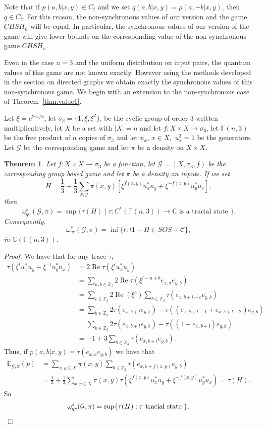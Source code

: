 \documentclass[11pt]{amsart}
\newtheorem{thm}{Theorem}[section]
\theoremstyle{definition}
\DeclareMathOperator{\re}{Re}
\newcommand{\bb}[1]{\mathbb{#1}}
\newcommand{\cl}[1]{\mathcal{#1}}
\begin{document}
Note that if $p(a, b| x, y) \in C_t$ and we set $q(a, b |x, y) = p(a, -b | x,y)$, then $q \in C_t$. For this reason, the non-synchronous values of our version and the game $CHSH_n$ will be equal. In particular, the synchronous values of our version of the game will give lower bounds on the corresponding value of the non-synchronous game $CHSH_n$. 
 
Even in the case $n=3$ and the uniform distribution on input pairs, the quantum values of this game are not known exactly.  However using the methods developed in the section on directed graphs we obtain exactly the synchronous values of this non-synchronous game.
We begin with an extension to the non-synchronous case of  Theorem~\ref{thm:value1}.

Let $\xi = e^{2 \pi i/3}$, let $\sigma_3 = \{ 1, \xi, \xi^2 \}$, be the cyclic group of order 3 written multiplicatively, let $X$ be a set with $|X| = n$ and let
$f:X \times X \to \sigma_3$, let $\bb F(n,3)$ be the free product of $n$ copies of $\sigma_3$ and let $u_x, \, x \in X, \,\, u_x^3=1$ be the generators. Let $\cl G$ be the corresponding game and let $\pi$ be a density on $X \times X$.

\begin{thm} Let $f:X \times X \to \sigma_3$ be a function, let $\cl G=(X, \sigma_3, f)$ be the corresponding group based game and let $\pi$ be a density on inputs.  If we set
\[H = \frac{1}{3} + \frac{1}{3}  \sum_{x,y} \pi(x,y) [\xi^{f(x,y)} u_x^*u_y + \xi^{-f(x,y)}u_y^*u_x],\]
 then
\[\omega^s_{qc}(\cl G, \pi) = \sup \{ \tau(H)\mid  \tau: C^*(\bb F(n,3)) \to \bb C \text{ is a tracial state } \}.\] Consequently,
\[\omega^s_{qc}(\cl G, \pi) = \inf \{ t:  t1 -H \in SOS+ \cl C \},\]
in $\bb C(\bb F(n,3))$. 
\end{thm}
\begin{proof} We have that for any trace $\tau$,
  \begin{align*}
    \tau(\xi^lu_x^*u_y+\xi^{-l}u_y^*u_x)&=2\re\tau(\xi^l u_x^*u_y)\\&=\sum_{a,b\in \bb Z_3}2\re\tau(\xi^{l-a+b}e_{x,a}e_{y,b})
    \\&=\sum_{c\in \bb Z_3}2\re(\xi^c)\sum_{b\in \bb Z_3}\tau(e_{x,b+l-c}e_{y,b})
    \\&=\sum_{b\in \bb Z_3} 2\tau(e_{x,b+l}e_{y,b})-\tau((e_{x,b+l-1}+e_{x,b+l-2})e_{y,b})
    \\&=\sum_{b\in \bb Z_3} 2\tau(e_{x,b+l}e_{y,b})-\tau((1-e_{x,b+l})e_{y,b})
    \\&=-1+3\sum_{b\in \bb Z_3}\tau(e_{x,b+l}e_{y,b}).
  \end{align*}
  Thus, if $p(a,b|x,y) = \tau(e_{x,a} e_{y,b})$ we have that
  \begin{align*}
    \bb E_{\cl G,\pi}(p)&=\sum_{x,y\in X}\pi(x,y)\sum_{b\in \bb Z_3}\tau(e_{x,b+f(x,y)}e_{y,b})
    \\&=\frac13+\frac13\sum_{x,y\in X}\pi(x,y)\tau(\xi^{f(x,y)}u_x^*u_y+\xi^{-f(x,y)}u_y^*u_x)=\tau(H).
  \end{align*}
So\[ \omega_{qc}^s(\cl G, \pi) = \sup \{ \tau(H) : \tau \text{ tracial state } \}.\qedhere\]
\end{proof}
\end{document}
